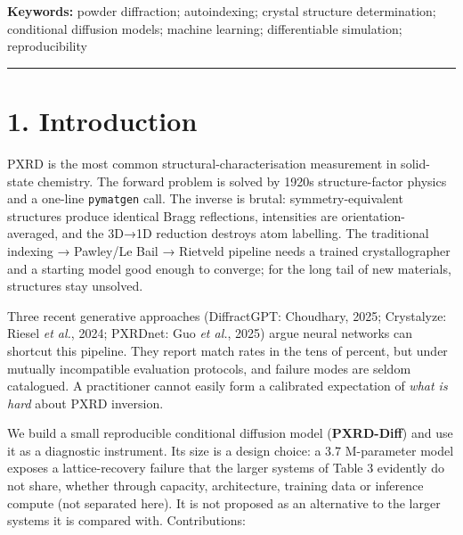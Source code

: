 \documentclass[
  11pt,
]{article}
\begin{document}
\textbf{Keywords:} powder diffraction; autoindexing; crystal structure
determination; conditional diffusion models; machine learning;
differentiable simulation; reproducibility

\begin{center}\rule{0.5\linewidth}{0.5pt}\end{center}

\section{1. Introduction}\label{introduction}

PXRD is the most common structural-characterisation measurement in
solid-state chemistry. The forward problem is solved by 1920s
structure-factor physics and a one-line \texttt{pymatgen} call. The
inverse is brutal: symmetry-equivalent structures produce identical
Bragg reflections, intensities are orientation-averaged, and the 3D→1D
reduction destroys atom labelling. The traditional indexing → Pawley/Le
Bail → Rietveld pipeline needs a trained crystallographer and a starting
model good enough to converge; for the long tail of new materials,
structures stay unsolved.

Three recent generative approaches (DiffractGPT: Choudhary, 2025;
Crystalyze: Riesel \emph{et al.}, 2024; PXRDnet: Guo \emph{et al.},
2025) argue neural networks can shortcut this pipeline. They report
match rates in the tens of percent, but under mutually incompatible
evaluation protocols, and failure modes are seldom catalogued. A
practitioner cannot easily form a calibrated expectation of \emph{what
is hard} about PXRD inversion.

We build a small reproducible conditional diffusion model
(\textbf{PXRD-Diff}) and use it as a diagnostic instrument. Its size is
a design choice: a 3.7 M-parameter model exposes a lattice-recovery
failure that the larger systems of Table 3 evidently do not share,
whether through capacity, architecture, training data or inference
compute (not separated here). It is not proposed as an alternative to
the larger systems it is compared with. Contributions:
\end{document}
